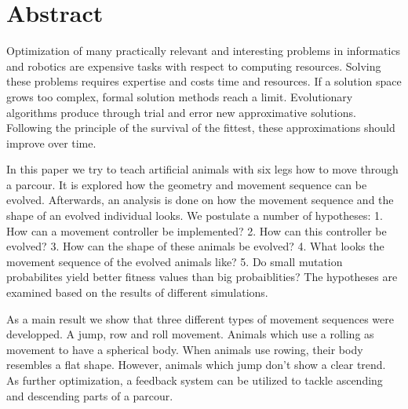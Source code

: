 %
%


\chapter{Abstract}

  Optimization of many practically relevant and
  interesting problems in informatics and robotics are expensive tasks with respect to computing resources.
  Solving these problems requires expertise and costs time and resources.
  If a solution space grows too complex, formal solution methods reach a limit.
  Evolutionary algorithms produce through trial and error new approximative solutions.
  Following the principle of the survival of the fittest, these approximations should improve over time.

  \smallskip

  In this paper we try to teach artificial animals with six legs how to move through a parcour.
  It is explored how the geometry and movement sequence can be evolved.
  Afterwards, an analysis is done on how the movement sequence and the shape of an evolved individual looks.
  We postulate a number of hypotheses:
  1. How can a movement controller be implemented?
  2. How can this controller be evolved?
  3. How can the shape of these animals be evolved?
  4. What looks the movement sequence of the evolved animals like?
  5. Do small mutation probabilites yield better fitness values than big probaiblities?
  The hypotheses are examined based on the results of different simulations.

  \smallskip

  As a main result we show that three different types of movement sequences were developped.
  A jump, row and roll movement. Animals which use a rolling as movement to have a spherical body.
  When animals use rowing, their body resembles a flat shape. However, animals which jump don't show a clear trend.
  As further optimization, a feedback system can be utilized to tackle ascending and descending parts of a parcour.
